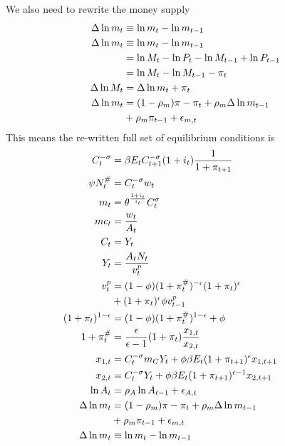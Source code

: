 \documentclass[twocolumn, fleqn]{article}
\begin{document}
	We also need to rewrite the money supply 
	\begin{align}
    \Delta \ln m_t &\equiv \ln m_t - \ln m_{t-1} \notag\\
    \Delta \ln m_t &\equiv \ln m_t - \ln m_{t-1} \notag\\
    &= \ln M_t - \ln P_t - \ln M_{t-1} + \ln P_{t-1} \notag\\
    &= \ln M_t - \ln M_{t-1} - \pi_t \notag\\
    \Delta \ln M_t &= \Delta \ln m_t + \pi_t \notag\\
    \Delta \ln m_t &= (1 - \rho_m) \pi - \pi_t + \rho_m \Delta \ln m_{t-1}\notag\\
    &+ \rho_m \pi_{t-1} + \epsilon_{m,t}
	\end{align}
	This means the re-written full set of equilibrium conditions is
	\begin{align}
    	\hspace{-30pt} C_t^{-\sigma} &= \beta E_t C_{t+1}^{-\sigma} (1 + i_t) \frac{1}{1 + \pi_{t+1}} \\
    	\hspace{-30pt} \psi N_t^{\#} &= C_t^{-\sigma} w_t \\
    	\hspace{-30pt} m_t &= \theta^{\frac{1 + i_t}{i_t}} C_t^{\sigma} \\
    	\hspace{-30pt} mc_t &= \frac{w_t}{A_t} \\
    	\hspace{-30pt} C_t &= Y_t \\
    	\hspace{-30pt} Y_t &= \frac{A_t N_t}{v_t^p} \\
    	\hspace{-30pt} v_t^p &= (1 - \phi) (1 + \pi_t^{\#})^{-\epsilon} (1 + \pi_t)^{\epsilon}\notag \\
    	& + (1 + \pi_t)^{\epsilon} \phi v_{t-1}^p \\
    	\hspace{-30pt} (1 + \pi_t)^{1-\epsilon} &= (1 - \phi) (1 + \pi_t^{\#})^{1-\epsilon} + \phi \\
    	\hspace{-30pt} 1 + \pi_t^{\#} &= \frac{\epsilon}{\epsilon - 1} (1 + \pi_t) \frac{x_{1,t}}{x_{2,t}} \\
    	\hspace{-30pt} x_{1,t} &= C_t^{-\sigma} m_C Y_t + \phi \beta E_t (1 + \pi_{t+1})^{\epsilon} x_{1,t+1} \\
    	\hspace{-30pt} x_{2,t} &= C_t^{-\sigma} Y_t + \phi \beta E_t (1 + \pi_{t+1})^{\epsilon-1} x_{2,t+1} \\
    	\hspace{-30pt} \ln A_t &= \rho_A \ln A_{t-1} + \epsilon_{A,t} \\
    	\hspace{-30pt} \Delta \ln m_t &= (1 - \rho_m) \pi - \pi_t + \rho_m \Delta \ln m_{t-1}\notag \\
    	& + \rho_m \pi_{t-1} + \epsilon_{m,t} \\
    	\hspace{-30pt} \Delta \ln m_t &\equiv \ln m_t - \ln m_{t-1}
	\end{align}
	
\end{document}
